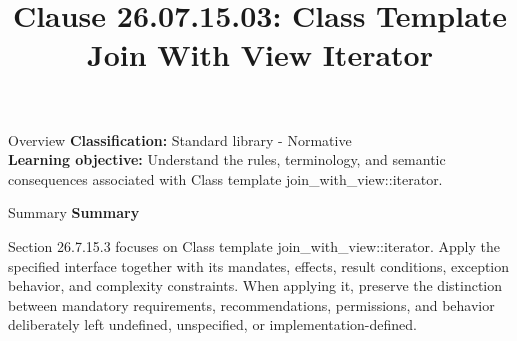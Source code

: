 \documentclass[10pt,letterpaper]{article}
\title{Clause 26.07.15.03: Class Template Join With View Iterator}
\author{}
\date{}
\begin{document}
\maketitle
\begin{CornellOverviewBox}{Overview}
\textbf{Classification:} Standard library - Normative\\[2pt]
\textbf{Learning objective:} Understand the rules, terminology, and semantic consequences associated with Class template join\_with\_view::iterator.
\end{CornellOverviewBox}\begin{CornellSummaryBox}{Summary}
{\sffamily\bfseries\color{Accent} Summary}\par\vspace{3pt}Section 26.7.15.3 focuses on Class template join\_with\_view::iterator. Apply the specified interface together with its mandates, effects, result conditions, exception behavior, and complexity constraints. When applying it, preserve the distinction between mandatory requirements, recommendations, permissions, and behavior deliberately left undefined, unspecified, or implementation-defined.
\end{CornellSummaryBox}
\end{document}
